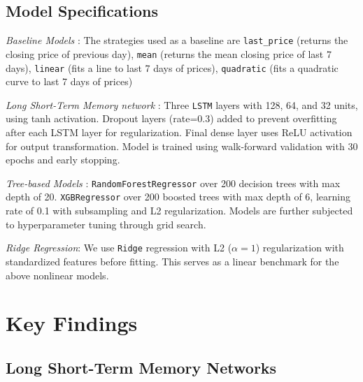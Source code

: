 \documentclass[11pt]{article}
\begin{document}
\subsection{Model Specifications}

\textit{Baseline Models} :  The strategies used as a baseline are \texttt{last\_price} (returns the closing price of previous day), \texttt{mean} (returns the mean closing price of last 7 days), \texttt{linear} (fits a line to last 7 days of prices), \texttt{quadratic} (fits a quadratic curve to last 7 days of prices)

\vspace{1em}

\textit{Long Short-Term Memory network} : Three \texttt{LSTM} layers with 128, 64, and 32 units, using tanh activation. Dropout layers (rate=0.3) added to prevent overfitting after each LSTM layer for regularization. Final dense layer uses ReLU activation for output transformation. Model is trained using walk-forward validation with 30 epochs and early stopping.

\vspace{1em}

\textit{Tree-based Models} : \texttt{RandomForestRegressor} over 200 decision trees with max depth of 20. \texttt{XGBRegressor} over 200 boosted trees with max depth of 6, learning rate of 0.1 with subsampling and L2 regularization. Models are further subjected to hyperparameter tuning through grid search. 

\vspace{1em}

\textit{Ridge Regression}: We use \texttt{Ridge} regression with L2 (\(\alpha = 1\)) regularization with standardized features before fitting. This serves as a linear benchmark for the above nonlinear models.

\section{Key Findings}
\label{sec:keyfindings}

\subsection{Long Short-Term Memory Networks}
\end{document}
